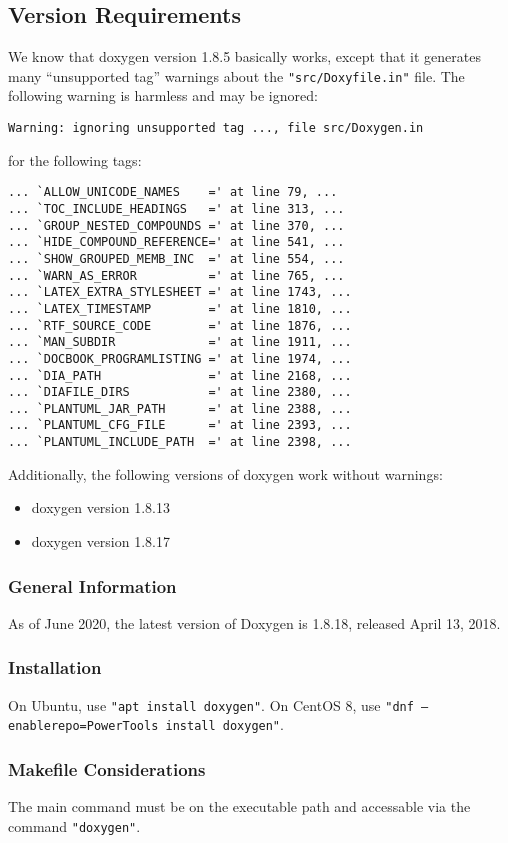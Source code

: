 \documentclass{article}
\begin{document}
\subsection{Version Requirements}
We know that doxygen version 1.8.5 basically works,
except that it generates many ``unsupported tag''
warnings about the {\tt "src/Doxyfile.in"} file.
The following warning is harmless and may be ignored:
\begin{verbatim}
Warning: ignoring unsupported tag ..., file src/Doxygen.in
\end{verbatim}
for the following tags:
\begin{verbatim}
... `ALLOW_UNICODE_NAMES    =' at line 79, ...
... `TOC_INCLUDE_HEADINGS   =' at line 313, ...
... `GROUP_NESTED_COMPOUNDS =' at line 370, ...
... `HIDE_COMPOUND_REFERENCE=' at line 541, ...
... `SHOW_GROUPED_MEMB_INC  =' at line 554, ...
... `WARN_AS_ERROR          =' at line 765, ...
... `LATEX_EXTRA_STYLESHEET =' at line 1743, ...
... `LATEX_TIMESTAMP        =' at line 1810, ...
... `RTF_SOURCE_CODE        =' at line 1876, ...
... `MAN_SUBDIR             =' at line 1911, ...
... `DOCBOOK_PROGRAMLISTING =' at line 1974, ...
... `DIA_PATH               =' at line 2168, ...
... `DIAFILE_DIRS           =' at line 2380, ...
... `PLANTUML_JAR_PATH      =' at line 2388, ...
... `PLANTUML_CFG_FILE      =' at line 2393, ...
... `PLANTUML_INCLUDE_PATH  =' at line 2398, ...
\end{verbatim}

Additionally, the following versions of doxygen work without warnings:
\begin{itemize}
\item doxygen version 1.8.13
\item doxygen version 1.8.17
\end{itemize}
\subsubsection{General Information}
As of June 2020, the latest version of Doxygen is 1.8.18,
released April 13, 2018.
\subsubsection{Installation}
On Ubuntu, use {\tt "apt install doxygen"}.
On CentOS 8, use {\tt "dnf --enablerepo=PowerTools install doxygen"}.
\subsubsection{Makefile Considerations}
The main command must be on the executable path and accessable
via the command \texttt{"doxygen"}.
\end{document}
